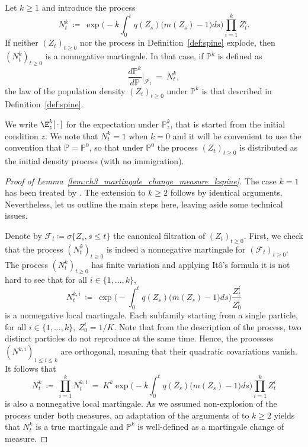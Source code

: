 \begin{refsegment}
\begin{lem}\label{lem:ch3_martingale_change_measure_kspine}
    Let $k \geqslant 1$ and introduce the process
    \begin{equation*}
        N^{k}_t\ \coloneqq\ 
        \exp{\Big(-k\int_0^t q(Z_s)\big(m(Z_s)-1\big)ds\Big)} 
        \prod_{i=1}^k Z^{i}_t.
    \end{equation*}
    If neither $(Z_t)_{t \geqslant 0}$ nor the process in Definition~\ref{def:spine}
    explode, then $(N^k_t)_{t \geqslant 0}$ is a nonnegative martingale. In
    that case, if $\mathbb{P}^k$ is defined as   
    \begin{equation} \label{eq:martingaleChange}
         \frac{d\mathbb{P}^k}{d\mathbb{P}}\Big|_{\mathcal{F}_t}\ =\ N^{k}_t,
    \end{equation}
    the law of the population density $(Z_t)_{t \geqslant 0}$ under $\mathbb{P}^k$ is
    that described in Definition~\ref{def:spine}.
\end{lem}
We write $\E^k_{z}[\,\cdot\,]$ for the expectation under
$\mathbb{P}^k_{z}$, that is started from the initial condition $z$.
We note that $N^k_t = 1$ when $k=0$ and it will be convenient to use the
convention that $\mathbb{P}=\mathbb{P}^0$, so that under $\mathbb{P}^0$
the process $(Z_t)_{t\geqslant 0}$ is distributed as the initial
density process (with no immigration).

\begin{proof}[Proof of Lemma~\ref{lem:ch3_martingale_change_measure_kspine}]
The case $k = 1$ has been treated by \cite[Proposition~2]{Bansaye}.
The extension to $k \geqslant 2$ follows by identical arguments. Nevertheless,
let us outline the main steps here, leaving aside some technical issues.

Denote by $\mathcal{F}_t\coloneqq \sigma\{ Z_s, s\leqslant t\}$ the canonical
filtration of $(Z_t)_{t\geqslant 0}$. First, we check that the process
$(N^{k}_t)_{t\geqslant 0}$ is indeed a nonnegative martingale for
$(\mathcal{F}_t)_{t\geqslant 0}$. The process $(N^{k}_t)_{t\geqslant 0}$ has finite
variation and applying Itô's formula it is not hard to see that for
all $i\in \{1,\ldots, k\}$, 
\[
N^{k,i}_t\ \coloneqq\ \exp{\Big(-\int_0^t
q(Z_s)\big(m(Z_s)-1\big)ds\Big)}\frac{Z^{i}_t}{Z^i_0}
\]
is a nonnegative
local martingale. Each subfamily starting from a single particle, for all $i\in\{1,\ldots,k\},\ Z^i_0 = 1/K$.
Note that from the description of the process, two distinct particles do
not reproduce at the same time. Hence, the processes $(N^{k,i})_{1\leqslant i\leqslant
k}$ are orthogonal, meaning that their quadratic
covariations vanish. It follows that 
  \begin{equation*} 
     N^{k}_t\ \coloneqq\ \prod_{i=1}^k N^{k,i}_t\ =\  K^k \exp\Big(-k\int_0^t q(Z_s)\big(m(Z_s)-1\big)ds\Big)\prod_{i=1}^k Z^{i}_t 
\end{equation*}
is also a nonnegative local martingale.  As we assumed non-explosion of the process under both measures,  an adaptation of the arguments of \citet[Proposition 2]{Bansaye} to $k\geqslant 2$ yields that $N^{k}_t$ is a true martingale and $\mathbb{P}^k$ is well-defined as a martingale change of measure. 
  

\end{proof}
\end{refsegment}
